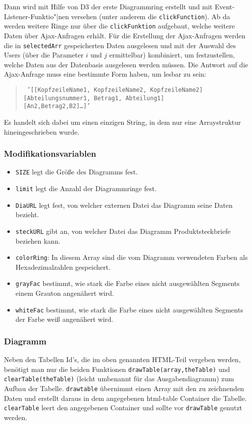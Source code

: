 \documentclass[a4paper,11pt,twoside]{article}
\begin{document}
Dann wird mit Hilfe von D3 der erste Diagrammring erstellt und mit
Event-Listener-Funktio"|nen versehen (unter anderem die
\texttt{clickFunction}).  Ab da werden weitere Ringe nur über die
\texttt{clickFunktion} aufgebaut, welche weitere Daten über Ajax-Anfragen
erhält. Für die Erstellung der Ajax-Anfragen werden die in
\texttt{selectedArr} gespeicherten Daten ausgelesen und mit der Auswahl des
Users (über die Parameter $i$ und $j$ ermittelbar) kombiniert, um
festzustellen, welche Daten aus der Datenbasis ausgelesen werden müssen. Die
Antwort auf die Ajax-Anfrage muss eine bestimmte Form haben, um lesbar zu
sein:
\begin{quote}  \tt
  '[[KopfzeileName1, KopfzeileName2, KopfzeileName2]\\{}
    [{\dq}Abteilungsnummer1{\dq}, Betrag1, {\dq}Abteilung1{\dq}]\\{}
    [{\dq}An2{\dq},Betrag2,{\dq}B2{\dq}]{\ldots}]'
\end{quote}
Es handelt sich dabei um einen einzigen String, in dem nur eine Arraystruktur
hineingeschrieben wurde.

\subsubsection{Modifikationsvariablen}
\begin{itemize}
\item \texttt{SIZE} legt die Größe des Diagramms fest.
\item \texttt{limit} legt die Anzahl der Diagrammringe fest.
\item \texttt{DiaURL} legt fest, von welcher externen Datei das Diagramm seine
  Daten bezieht.
\item \texttt{steckURL} gibt an, von welcher Datei das Diagramm
  Produktsteckbriefe beziehen kann.
\item \texttt{colorRing}: In diesem Array sind die vom Diagramm verwendeten Farben als
  Hexadezimalzahlen gespeichert.
\item \texttt{grayFac} bestimmt, wie stark die Farbe eines nicht ausgewählten Segments
  einem Grauton angenähert wird.
\item \texttt{whiteFac} bestimmt, wie stark die Farbe eines nicht ausgewählten
  Segments der Farbe weiß angenähert wird.
\end{itemize}    

\subsubsection{Diagramm}
Neben den Tabellen Id's, die im oben genannten HTML-Teil vergeben werden,
benötigt man nur die beiden Funktionen \texttt{drawTable(array,theTable)} und
\texttt{clearTable(theTable)} (leicht umbenannt für das Ausgabendiagramm) zum
Aufbau der Tabelle. \texttt{drawtable} übernimmt einen Array mit den zu
zeichnenden Daten und erstellt daraus in dem angegebenen html-table Container
die Tabelle. \texttt{clearTable} leert den angegebenen Container und sollte
vor \texttt{drawTable} genutzt werden.
\end{document}
